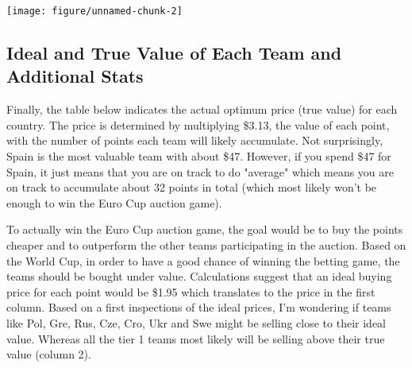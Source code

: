 \documentclass{article}\usepackage[]{graphicx}\usepackage[]{color}
\makeatletter
\def\maxwidth{ %
  \ifdim\Gin@nat@width>\linewidth
    \linewidth
  \else
    \Gin@nat@width
  \fi
}
\newenvironment{knitrout}{}{} %
\makeatother
\begin{document}
\vspace{10mm}


\begin{knitrout}
\color{fgcolor}
\texttt{[image: figure/unnamed-chunk-2]} 

\end{knitrout}


\subsection{Ideal and True Value of Each Team and Additional Stats} %

Finally, the table below indicates the actual optimum price (true value) for each country. The price is determined by multiplying \$3.13, the value of each point, with the number of points each team will likely accumulate. Not surprisingly, Spain is the most valuable team with about \$47. However, if you spend \$47 for Spain, it just means that you are on track to do "average" which means you are on track to accumulate about 32 points in total (which most likely won't be enough to win the Euro Cup auction game). 

To actually win the Euro Cup auction game, the goal would be to buy the points cheaper and to outperform the other teams participating in the auction. Based on the World Cup, in order to have a good chance of winning the betting game, the teams should be bought under value. Calculations suggest that an ideal buying price for each point would be \$1.95 which translates to the price in the first column. Based on a first inspections of the ideal prices, I'm wondering if teams like Pol, Gre, Rus, Cze, Cro, Ukr and Swe might be selling close to their ideal value. Whereas all the tier 1 teams most likely will be selling above their true value (column 2).

\vspace{10mm}
\end{document}
